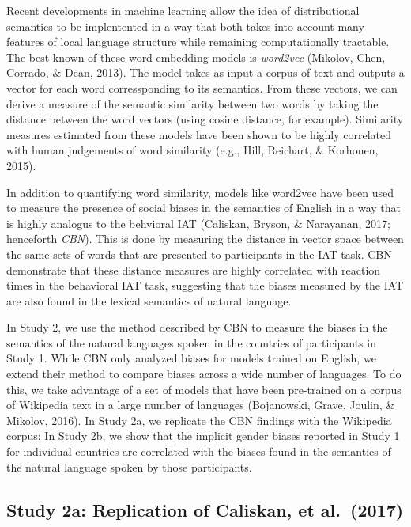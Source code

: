 \documentclass[10pt, letterpaper]{article}
\begin{document}
Recent developments in machine learning allow the idea of distributional
semantics to be implentented in a way that both takes into account many
features of local language structure while remaining computationally
tractable. The best known of these word embedding models is
\emph{word2vec} (Mikolov, Chen, Corrado, \& Dean, 2013). The model takes
as input a corpus of text and outputs a vector for each word
corressponding to its semantics. From these vectors, we can derive a
measure of the semantic similarity between two words by taking the
distance between the word vectors (using cosine distance, for example).
Similarity measures estimated from these models have been shown to be
highly correlated with human judgements of word similarity (e.g., Hill,
Reichart, \& Korhonen, 2015).

In addition to quantifying word similarity, models like word2vec have
been used to measure the presence of social biases in the semantics of
English in a way that is highly analogus to the behvioral IAT (Caliskan,
Bryson, \& Narayanan, 2017; henceforth \emph{CBN}). This is done by
measuring the distance in vector space between the same sets of words
that are presented to participants in the IAT task. CBN demonstrate that
these distance measures are highly correlated with reaction times in the
behavioral IAT task, suggesting that the biases measured by the IAT are
also found in the lexical semantics of natural language.

In Study 2, we use the method described by CBN to measure the biases in
the semantics of the natural languages spoken in the countries of
participants in Study 1. While CBN only analyzed biases for models
trained on English, we extend their method to compare biases across a
wide number of languages. To do this, we take advantage of a set of
models that have been pre-trained on a corpus of Wikipedia text in a
large number of languages (Bojanowski, Grave, Joulin, \& Mikolov, 2016).
In Study 2a, we replicate the CBN findings with the Wikipedia corpus; In
Study 2b, we show that the implicit gender biases reported in Study 1
for individual countries are correlated with the biases found in the
semantics of the natural language spoken by those participants.

\subsection{Study 2a: Replication of Caliskan, et
al.~(2017)}\label{study-2a-replication-of-caliskan-et-al.2017}
\end{document}
